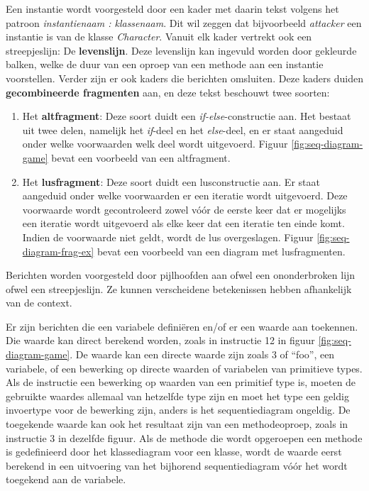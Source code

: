 Een instantie wordt voorgesteld door een kader met daarin tekst volgens het patroon \textit{instantienaam : klassenaam}. Dit wil zeggen dat bijvoorbeeld \textit{attacker} een instantie is van de klasse \textit{Character}. Vanuit elk kader vertrekt ook een streepjeslijn: De \textbf{levenslijn}. Deze levenslijn kan ingevuld worden door gekleurde balken, welke de duur van een oproep van een methode aan een instantie voorstellen.
Verder zijn er ook kaders die berichten omsluiten. Deze kaders duiden \textbf{gecombineerde fragmenten} aan, en deze tekst beschouwt twee soorten:

\begin{enumerate}
	\item Het \textbf{altfragment}: Deze soort duidt een \textit{if-else}-constructie aan. Het bestaat uit twee delen, namelijk het \textit{if}-deel en het \textit{else}-deel, en er staat aangeduid onder welke voorwaarden welk deel wordt uitgevoerd. Figuur \ref{fig:seq-diagram-game} bevat een voorbeeld van een altfragment.
	\item Het \textbf{lusfragment}: Deze soort duidt een lusconstructie aan. Er staat aangeduid onder welke voorwaarden er een iteratie wordt uitgevoerd. Deze voorwaarde wordt gecontroleerd zowel v\'o\'or de eerste keer dat er mogelijks een iteratie wordt uitgevoerd als elke keer dat een iteratie ten einde komt. Indien de voorwaarde niet geldt, wordt de lus overgeslagen. Figuur \ref{fig:seq-diagram-frag-ex} bevat een voorbeeld van een diagram met lusfragmenten.
\end{enumerate}

Berichten worden voorgesteld door pijlhoofden aan ofwel een ononderbroken lijn ofwel een streepjeslijn. Ze kunnen verscheidene betekenissen hebben afhankelijk van de context.

Er zijn berichten die een variabele defini\"eren en/of er een waarde aan toekennen. Die waarde kan direct berekend worden, zoals in instructie 12 in figuur \ref{fig:seq-diagram-game}. De waarde kan een directe waarde zijn zoals 3 of ``foo'', een variabele, of een bewerking op directe waarden of variabelen van primitieve types. Als de instructie een bewerking op waarden van een primitief type is, moeten de gebruikte waardes allemaal van hetzelfde type zijn en moet het type een geldig invoertype voor de bewerking zijn, anders is het sequentiediagram ongeldig. De toegekende waarde kan ook het resultaat zijn van een methodeoproep, zoals in instructie 3 in dezelfde figuur. Als de methode die wordt opgeroepen een methode is gedefinieerd door het klassediagram voor een klasse, wordt de waarde eerst berekend in een uitvoering van het bijhorend sequentiediagram v\'o\'or het wordt toegekend aan de variabele.

